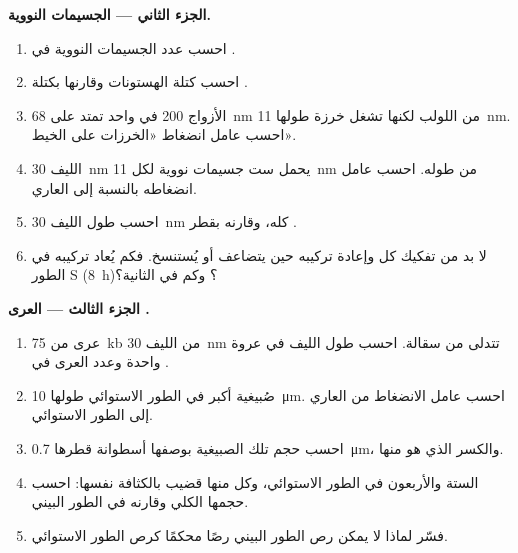 \begin{problem}
\medskip
\noindent\textbf{الجزء الثاني --- الجسيمات النووية.}
\begin{enumerate}[resume]
  \item احسب عدد الجسيمات النووية في .
  \item احسب كتلة الهستونات وقارنها بكتلة .
  \item الأزواج \qty{200}{} في  واحد تمتد على \qty{68}{nm}
        من اللولب لكنها تشغل خرزة طولها \qty{11}{nm}. احسب عامل
        انضغاط «الخرزات على الخيط».
  \item الليف \qty{30}{nm} يحمل ست جسيمات نووية لكل \qty{11}{nm} من
        طوله. احسب عامل انضغاطه بالنسبة إلى  العاري.
  \item احسب طول الليف \qty{30}{nm}  كله، وقارنه بقطر .
  \item لا بد من تفكيك كل  وإعادة تركيبه حين يتضاعف  أو
        يُستنسخ. فكم  يُعاد تركيبه في الطور S
        (\qty{8}{h})؟ وكم في الثانية؟
\end{enumerate}

\medskip
\noindent\textbf{الجزء الثالث --- العرى .}
\begin{enumerate}[resume]
  \item عرى من \qty{75}{kb} من الليف \qty{30}{nm} تتدلى من سقالة.
        احسب طول الليف في عروة واحدة وعدد العرى في .
  \item صُبيغية أكبر  في الطور الاستوائي طولها
        \qty{10}{\micro m}. احسب عامل الانضغاط من  العاري إلى 
        الطور الاستوائي.
  \item احسب حجم تلك الصبيغية بوصفها أسطوانة قطرها
        \qty{0.7}{\micro m}، والكسر الذي هو  منها.
  \item {} الستة والأربعون في الطور الاستوائي، وكل منها قضيب
        بالكثافة نفسها: احسب حجمها الكلي وقارنه  في الطور
        البيني.
  \item فسّر لماذا لا يمكن رص  الطور البيني رصًا محكمًا كرص 
        الطور الاستوائي.
\end{enumerate}


\end{problem}
